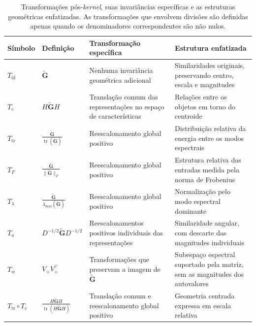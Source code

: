 \begin{table}[pos=ht]
\scriptsize
\centering
\caption{Transformações pós-\textit{kernel}, suas invariâncias específicas e as estruturas geométricas enfatizadas. As transformações que envolvem divisões são definidas apenas quando os denominadores correspondentes são não nulos.}
\label{tab:T_catalog}
\renewcommand{\arraystretch}{1.4}
\begin{tabular}{p{1.5cm} p{2.5cm} p{4.3cm} p{4.6cm}}
\hline
\textbf{Símbolo}
&
\textbf{Definição}
&
\textbf{Transformação específica}
&
\textbf{Estrutura enfatizada}
\\
\hline

$T_{\mathrm{id}}$
&
$\widetilde{\mathbf{G}}$
&
Nenhuma invariância geométrica adicional
&
Similaridades originais, preservando centro, escala e magnitudes
\\

$T_c$
&
$H\widetilde{\mathbf{G}}H$
&
Translação comum das representações no espaço de características
&
Relações entre os objetos em torno do centroide
\\

$T_{\mathrm{tr}}$
&
$\displaystyle
\frac{\widetilde{\mathbf{G}}}
{\operatorname{tr}(\widetilde{\mathbf{G}})}$
&
Reescalonamento global positivo
&
Distribuição relativa da energia entre os modos espectrais
\\

$T_F$
&
$\displaystyle
\frac{\widetilde{\mathbf{G}}}
{\|\widetilde{\mathbf{G}}\|_F}$
&
Reescalonamento global positivo
&
Estrutura relativa das entradas medida pela norma de Frobenius
\\

$T_{\lambda}$
&
$\displaystyle
\frac{\widetilde{\mathbf{G}}}
{\lambda_{\max}(\widetilde{\mathbf{G}})}$
&
Reescalonamento global positivo
&
Normalização pelo modo espectral dominante
\\

$T_a$
&
$\displaystyle
D^{-1/2}
\widetilde{\mathbf{G}}
D^{-1/2}$
&
Reescalonamentos positivos individuais das representações
&
Similaridade angular, com descarte das magnitudes individuais
\\

$T_w$
&
$V_+V_+^{\top}$
&
Transformações que preservam a imagem de $\widetilde{\mathbf{G}}$
&
Subespaço espectral suportado pela matriz, sem as magnitudes dos autovalores
\\

$T_{\mathrm{tr}}\circ T_c$
&
$\displaystyle
\frac{
    H\widetilde{\mathbf{G}}H
}{
    \operatorname{tr}
    \left(
        H\widetilde{\mathbf{G}}H
    \right)
}$
&
Translação comum e reescalonamento global positivo
&
Geometria centrada expressa em escala relativa
\\

\hline
\end{tabular}
\end{table}

